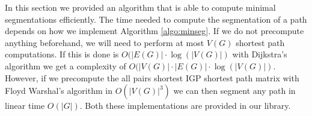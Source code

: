 In this section we provided an algorithm that is able to compute minimal segmentations efficiently. The time needed to compute the
segmentation of a path depends on how we implement Algorithm \ref{algo:minseg}. If we do not precompute anything beforehand, we
will need to perform at most $V(G)$ shortest path computations. If this is done is $O(|E(G)| \cdot \log(|V(G)|)$ with Dijkstra's 
algorithm we get a complexity of $O(|V(G)| \cdot |E(G)| \cdot \log(|V(G)|)$. However, if we precompute the all pairs shortest IGP
shortest path matrix with Floyd Warshal's algorithm in $O(|V(G)|^3)$ we can then segment any path in linear time $O(|G|)$. Both these implementations
are provided in our library.


% 
% 
% 
% 
% 
% 
% 
% 
% 

